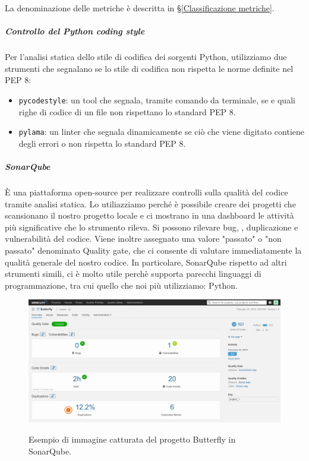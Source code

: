 			La denominazione delle metriche è descritta in \S\ref{Classificazione metriche}.

			\subparagraph{Controllo del Python coding style}\label{pycodestyle}
			Per l'analisi statica dello stile di codifica dei sorgenti Python, utilizziamo due strumenti che segnalano se lo stile di codifica non rispetta
			le norme definite nel PEP 8:
			\begin{itemize}
				\item \texttt{pycodestyle}: un tool che segnala, tramite comando da terminale, se e quali righe di codice di un file non rispettano lo standard PEP 8.
				\item \texttt{pylama}: un linter che segnala dinamicamente se ciò che viene digitato contiene degli errori o non rispetta
					lo standard PEP 8.
			\end{itemize}

			\subparagraph{SonarQube} \label{sonarqube}
			È una piattaforma open-source per realizzare controlli sulla qualità del codice tramite analisi statica.
			Lo utiliazziamo perché è possibile creare dei progetti che scansionano il nostro progetto locale e ci mostrano in una dashboard le attività più significative che lo strumento rileva.
			Si possono rilevare bug, , duplicazione e vulnerabilità del codice.
			Viene inoltre assegnato una valore "passato" o "non passato" denominato Quality gate, che ci consente di valutare immediatamente la qualità generale del nostro codice. 
			In particolare, SonarQube rispetto ad altri strumenti simili, ci è molto utile perchè supporta parecchi linguaggi di programmazione, tra cui quello che noi più utilizziamo: Python.

			\begin{figure}[H]
				\centering
				\includegraphics[width=\textwidth]{img/sonar.png}\\
				\caption[Screen SonarQube]{Esempio di immagine catturata del progetto Butterfly in SonarQube.}
				\label{fig:butterflySonar}
			\end{figure}

